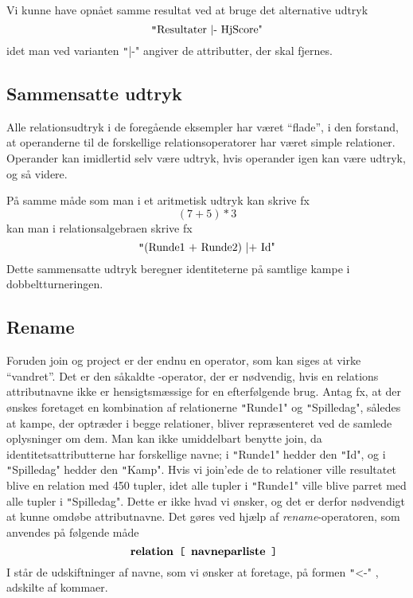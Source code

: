 \documentclass{article}
\newcounter{eks}
\begin{document}
Vi kunne have opn\aa{}et samme resultat ved at bruge det alternative
udtryk
$$ \mbox{\texttt"Resultater |- HjScore"} $$
idet man ved varianten \texttt"|-" angiver de attributter, der skal fjernes.

\subsection{Sammensatte udtryk}
Alle relationsudtryk i de foreg\aa{}ende eksempler har v\ae{}ret
``flade'', i den forstand, at operanderne til de forskellige
relationsoperatorer har v\ae{}ret simple relationer. Operander kan imidlertid
selv v\ae{}re udtryk, hvis op\-er\-an\-der igen kan v\ae{}re udtryk, og s\aa{}
videre.

P\aa{} samme m\aa{}de som man i et aritmetisk udtryk kan skrive fx
$$ (7+5)*3 $$
kan man i relationsalgebraen skrive fx
$$ \mbox{\texttt"(Runde1 + Runde2) |+ Id"} $$
Dette sammensatte udtryk beregner 
identiteterne p\aa{} samtlige kampe i dobbeltturneringen.

\subsection{Rename}
Foruden join og project er der endnu en operator, som kan siges at virke
``vandret''. Det er den s\aa{}kaldte {\em {}}-operator, der er
n\o{}dvendig, hvis en relations attributnavne ikke er
hensigtsm\ae{}ssige for en efterf\o{}lgende brug. Antag fx, at
der \o{}nskes foretaget en kombination af relationerne \texttt"Runde1" og
\texttt"Spilledag", s\aa{}ledes at kampe, der optr\ae{}der i begge
relationer, bliver repr\ae{}senteret ved de samlede oplysninger om dem.
Man kan ikke umiddelbart benytte join, da identitetsattributterne har
forskellige navne; i \texttt"Runde1" hedder den \texttt"Id", og i
\texttt"Spilledag" hedder den \texttt"Kamp". 
Hvis vi join'ede de to relationer ville resultatet blive en relation
med 450 tupler, idet alle tupler i \texttt"Runde1" ville blive
parret med alle tupler i \texttt"Spilledag". Dette er ikke hvad
vi \o{}nsker, og det er derfor n\o{}dvendigt at kunne omd\o{}be
attributnavne. Det g\o{}res ved hj\ae{}lp af {\em rename}-operatoren,
som anvendes p\aa{} f\o{}lgende m\aa{}de
$$ \META{relation} \mbox{\tt ~[~} \META{\qind{navneparliste}} \mbox{\tt ~]~} $$
I  st\aa{}r de udskiftninger af navne, som vi
\o{}nsker at foretage, p\aa{} formen
 \texttt"<-" , adskilte af kommaer.
\end{document}
